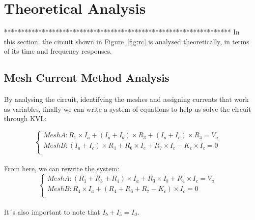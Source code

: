 \section{Theoretical Analysis}
\label{sec:analysis}

******************************************************************
In this section, the circuit shown in Figure~\ref{fig:rc} is analysed
theoretically, in terms of its time and frequency responses.

\subsection{Mesh Current Method Analysis}

\paragraph{}
By analysing the circuit, identifying the meshes and assigning currents that work as variables, finally we can write a system of equations to help us solve the circuit through KVL:

\[
\left\{\begin{matrix}
Mesh A: R_1 \times I_a+(I_a+I_b) \times R_3+(I_a+I_c) \times R_4=V_a\\
Mesh B:	(I_a+I_c) \times R_4+R_6 \times I_c+R_7 \times I_c-K_c \times I_c=0\\
\end{matrix}\right.
\]

\paragraph{}
From here, we can rewrite the system:
\[
\left\{\begin{matrix}
Mesh A: (R_1+R_3+R_4) \times I_a+R_3 \times I_b+R_4 \times I_c=V_a\\
Mesh B: R_4 \times I_a+(R_4+R_6+R_7-K_c) \times I_c=0\\
\end{matrix}\right.
\]

\paragraph{}
It´s also important to note that $ I_b+I_5=I_d $.

